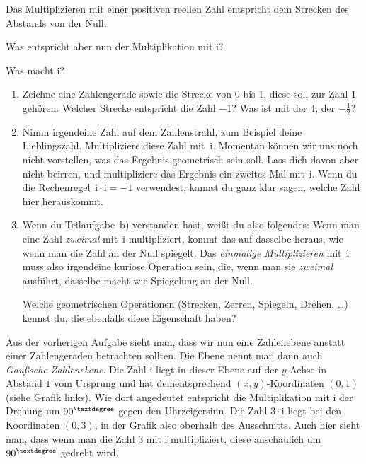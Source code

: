 \documentclass{zirkelblatt1415}
\newcommand{\ii}{\mathrm{i}}
\begin{document}
Das Multiplizieren mit einer positiven reellen Zahl entspricht dem Strecken des Abstands von der Null.

Was entspricht aber nun der Multiplikation mit $\ii$?

\newpage

\begin{aufgabe}{Was macht $\ii$?}
\begin{enumerate}
  \item Zeichne eine Zahlengerade sowie die Strecke von $0$ bis $1$, diese soll zur Zahl $1$ gehören. Welcher Strecke entspricht die Zahl $-1$? Was ist mit der $4$, der $-\frac{1}{2}?$
  \item Nimm irgendeine Zahl auf dem Zahlenstrahl, zum Beispiel deine Lieblingszahl. Multipliziere diese Zahl mit~$\ii$. Momentan können wir uns noch nicht vorstellen, was das Ergebnis geometrisch sein soll. Lass dich davon aber nicht beirren, und multipliziere das Ergebnis ein zweites Mal mit~$\ii$. Wenn du die Rechenregel~$\ii \cdot \ii = -1$ verwendest, kannst du ganz klar sagen, welche Zahl hier herauskommt.
  \item Wenn du Teilaufgabe~b) verstanden hast, weißt du also folgendes: Wenn man eine Zahl \emph{zweimal} mit~$\ii$ multipliziert, kommt das auf dasselbe heraus, wie wenn man die Zahl an der Null spiegelt. Das \emph{einmalige Multiplizieren} mit~$\ii$ muss also irgendeine kuriose Operation sein, die, wenn man sie \emph{zweimal} ausführt, dasselbe macht wie Spiegelung an der Null.

Welche geometrischen Operationen (Strecken, Zerren, Spiegeln, Drehen, \ldots) kennst du, die ebenfalls diese Eigenschaft haben?
\end{enumerate}
\end{aufgabe}

Aus der vorherigen Aufgabe sieht man, dass wir nun eine Zahlenebene anstatt einer Zahlengeraden betrachten sollten. Die Ebene nennt man dann auch \emph{Gaußsche Zahlenebene}. Die Zahl $\ii$ liegt in dieser Ebene auf der $y$-Achse in Abstand $1$ vom Ursprung und hat dementsprechend $(x,y)$-Koordinaten $(0,1)$ (siehe Grafik links). Wie dort angedeutet entspricht die Multiplikation mit $\ii$ der Drehung um $90^{\textdegree}$ gegen den Uhrzeigersinn. Die Zahl $3\cdot\ii$ liegt bei den Koordinaten $(0,3)$, in der Grafik also oberhalb des Ausschnitts. Auch hier sieht man, dass wenn man die Zahl $3$ mit $\ii$ multipliziert, diese anschaulich um $90^{\textdegree}$ gedreht wird.
\end{document}
